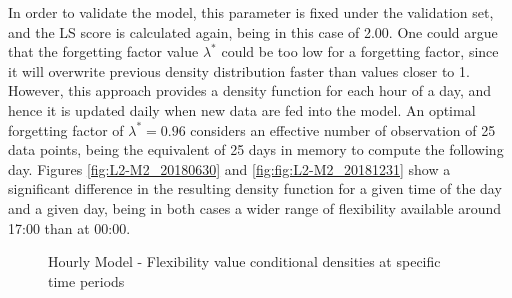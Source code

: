 In order to validate the model, this parameter is fixed under the validation set, and the LS score is calculated again, being in this case of 2.00. One could argue that the forgetting factor value $\lambda^{*}$ could be too low for a forgetting factor, since it will overwrite previous density distribution faster than values closer to 1. However, this approach provides a density function for each hour of a day, and hence it is updated daily when new data are fed into the model. An optimal forgetting factor of $\lambda^* = 0.96$ considers an effective number of observation of 25 data points, being the equivalent of 25 days in memory to compute the following day. Figures \ref{fig:L2-M2_20180630} and \ref{fig:fig:L2-M2_20181231} show a significant difference in the resulting density function for a given time of the day and a given day, being in both cases a wider range of flexibility available around 17:00 than at 00:00. 




\begin{figure}
\centering    
{}
\caption{Hourly Model - Flexibility value conditional densities at specific time periods}
\label{fig:conditional_densities_L2}
\end{figure}


